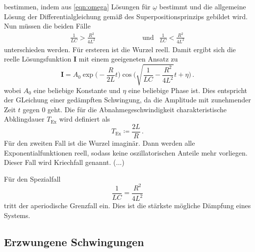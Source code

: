 bestimmen, indem aus \eqref{eqn:omega} Lösungen für $\underline{\omega}$ bestimmt
und die allgemeine Lösung der Differentialgleichung gemäß des Superpositionsprinzips
gebildet wird. Nun müssen die beiden Fälle
\begin{align}
  \frac{1}{LC}>\frac{R^2}{4L^2} & \qquad\qquad\qquad\text{und} & \frac{1}{LC}<\frac{R^2}{4L^2}
\end{align}
unterschieden werden. Für ersteren ist die Wurzel reell. Damit ergibt sich die
reelle Lösungsfunktion $\symbf{I}$ mit einem geeigeneten Ansatz zu
\begin{equation}
  \symbf{I}=A_{\text{0}}\exp\biggl(-\frac{R}{2L}t\biggr)\cos\Biggl(
  \sqrt{\frac{1}{LC}-\frac{R^2}{4L^2}}t+\eta\Biggr)\,.
\end{equation}
wobei $A_{\text{0}}$ eine beliebige Konstante und $\eta$ eine beliebige Phase ist.
Dies entspricht der GLeichung einer gedämpften Schwingung, da die Amplitude mit zunehmender
Zeit $t$ gegen $0$ geht.
Die für die Abnahmegeschwindigkeit charakteristische Abklingdauer $T_{\text{Ex}}$
wird definiert als
\begin{equation}
  T_{\text{Ex}}\coloneq\frac{2L}{R} \,.
  \label{eqn:abklingdauer}
\end{equation}
Für den zweiten Fall ist die Wurzel imaginär. Dann werden alle Exponentialfunktionen
reell, sodass keine oszillatorischen Anteile mehr vorliegen. Dieser Fall wird
Kriechfall genannt. (...)


Für den Spezialfall
\begin{equation}
  \frac{1}{LC}=\frac{R^2}{4L^2}
\end{equation}
tritt der aperiodische Grenzfall ein. Dies ist die stärkste mögliche Dämpfung eines
Systems.

\subsection{Erzwungene Schwingungen}
\label{Erzwungene_Schwingungen}
